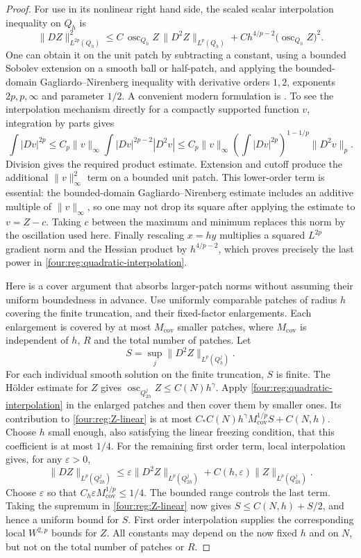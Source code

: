 \begin{proof}
For use in its nonlinear right hand side, the scaled scalar
interpolation inequality on $Q_h$ is
\begin{equation}\label{four:reg:quadratic-interpolation}
 \|DZ\|_{L^{2p}(Q_h)}^2
 \le C\,\operatorname{osc}_{Q_h}Z\,
                  \|D^2Z\|_{L^p(Q_h)}
       +Ch^{4/p-2}\bigl(\operatorname{osc}_{Q_h}Z\bigr)^2.
\end{equation}
One can obtain it on the unit patch by subtracting a constant,
using a bounded Sobolev extension on a smooth ball or half-patch,
and applying the bounded-domain Gagliardo--Nirenberg inequality
with derivative orders $1,2$, exponents $2p,p,\infty$ and parameter
$1/2$. A convenient modern formulation is
\cite[Theorem~1.3]{LiZhang2022}.  To see the interpolation mechanism directly
for a compactly supported function $v$, integration by parts gives
\[
 \int|Dv|^{2p}
 \le C_p\|v\|_\infty
             \int|Dv|^{2p-2}|D^2v|
 \le C_p\|v\|_\infty
      \left(\int|Dv|^{2p}\right)^{1-1/p}\|D^2v\|_p.
\]
Division gives the required product estimate.  Extension and
cutoff produce the additional $\|v\|_\infty^2$ term on a bounded
unit patch. This lower-order term is essential: the bounded-domain
Gagliardo--Nirenberg estimate includes an additive multiple of
$\|v\|_\infty$, so one may not drop its square after applying the
estimate to $v=Z-c$. Taking $c$ between the maximum and minimum replaces
this norm by the oscillation used here.  Finally rescaling $x=hy$ multiplies a squared
$L^{2p}$ gradient norm and the Hessian product by $h^{4/p-2}$,
which proves precisely the last power in
\eqref{four:reg:quadratic-interpolation}.

Here is a cover argument that absorbs larger-patch norms without
assuming their uniform boundedness in advance.  Use uniformly
comparable patches of radius $h$ covering the finite truncation,
and their fixed-factor enlargements.  Each enlargement is covered
by at most $M_{\mathrm{cov}}$ smaller patches, where $M_{\mathrm{cov}}$ is independent of $h$,
$R$ and the total number of patches.  Let
\[
 S=\sup_j\|D^2Z\|_{L^p(Q_h^j)}.
\]
For each individual smooth solution on the finite truncation,
$S$ is finite.  The H\"older estimate for $Z$ gives
$\operatorname{osc}_{Q_{2h}^j}Z\le C(N)h^\gamma$.
Apply \eqref{four:reg:quadratic-interpolation} in the enlarged patches
and then cover them by smaller ones.  Its contribution to
\eqref{four:reg:Z-linear} is at most
$C_*C(N)h^\gamma M_{\mathrm{cov}}^{1/p}S+C(N,h)$.
Choose $h$ small enough, also satisfying the linear freezing
condition, that this coefficient is at most $1/4$.
For the remaining first order term, local interpolation gives,
for any $\varepsilon>0$,
\[
 \|DZ\|_{L^p(Q_{2h}^j)}
 \le\varepsilon\|D^2Z\|_{L^p(Q_{2h}^j)}
                   +C(h,\varepsilon)\|Z\|_{L^p(Q_{2h}^j)}.
\]
Choose $\varepsilon$ so that $C_h\varepsilon M_{\mathrm{cov}}^{1/p}\le1/4$.
The bounded range controls the last term.  Taking the supremum
in \eqref{four:reg:Z-linear} now gives
$S\le C(N,h)+S/2$, and hence a uniform bound for $S$.
First order interpolation supplies the corresponding local
$W^{2,p}$ bounds for $Z$.  All constants may depend on the now
fixed $h$ and on $N$, but not on the total number of patches or $R$.


\end{proof}
